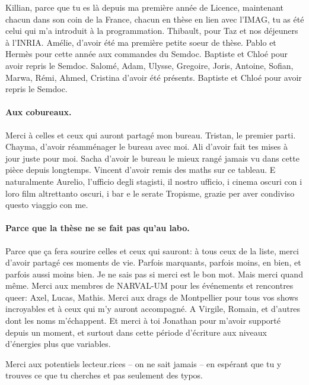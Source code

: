 Killian, parce que tu es là depuis ma première année de Licence, maintenant chacun dans son coin de la France, chacun en thèse en lien avec l'IMAG, tu as été celui qui m'a introduit à la programmation.
Thibault, pour Taz et nos déjeuners à l'INRIA.
Amélie, d'avoir été ma première petite soeur de thèse.
Pablo et Hermès pour cette année aux commandes du Semdoc.
Baptiste et Chloé pour avoir repris le Semdoc.
Salomé, Adam, Ulysse, Gregoire, Joris, Antoine, Sofian, Marwa, Rémi, Ahmed, Cristina d'avoir été présents.
Baptiste et Chloé pour avoir repris le Semdoc.

\medskip

\paragraph*{Aux cobureaux.}
Merci à celles et ceux qui auront partagé mon bureau.
Tristan, le premier parti.
Chayma, d'avoir réamménager le bureau avec moi.
Ali d'avoir fait tes mises à jour juste pour moi.
Sacha d'avoir le bureau le mieux rangé jamais vu dans cette pièce depuis longtemps.
Vincent d'avoir remis des maths sur ce tableau.
E naturalmente Aurelio, l'ufficio degli stagisti, il nostro ufficio, i cinema oscuri con i loro film altrettanto oscuri, i bar e le serate Tropisme, grazie per aver condiviso questo viaggio con me.

\medskip

\paragraph*{Parce que la thèse ne se fait pas qu'au labo.}
Parce que ça fera sourire celles et ceux qui sauront: à tous ceux de la liste, merci d'avoir partagé ces moments de vie. Parfois marquants, parfois moins, en bien, et parfois aussi moins bien. Je ne sais pas si merci est le bon mot. Mais merci quand même.
Merci aux membres de NARVAL-UM pour les événements et rencontres queer: Axel, Lucas, Mathis.
Merci aux drags de Montpellier pour tous vos shows incroyables et à ceux qui m'y auront accompagné.
A Virgile, Romain, et d'autres dont les noms m'échappent.
Et merci à toi Jonathan pour m'avoir supporté depuis un moment, et surtout dans cette période d'écriture aux niveaux d'énergies plus que variables.

\medskip

Merci aux potentiels lecteur.rices -- on ne sait jamais -- en espérant que tu y trouves ce que tu cherches et pas seulement des typos.

\bigskip
\vspace{8cm}

